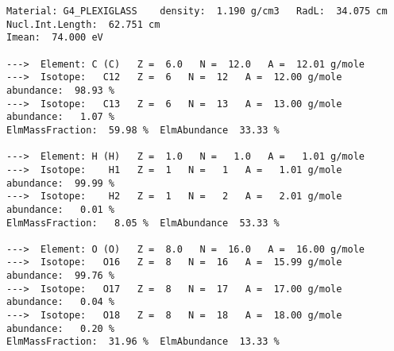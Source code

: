 {\begin{verbatim}
Material: G4_PLEXIGLASS    density:  1.190 g/cm3   RadL:  34.075 cm   Nucl.Int.Length:  62.751 cm 
Imean:  74.000 eV 

--->  Element: C (C)   Z =  6.0   N =  12.0   A =  12.01 g/mole
--->  Isotope:   C12   Z =  6   N =  12   A =  12.00 g/mole   abundance:  98.93 %
--->  Isotope:   C13   Z =  6   N =  13   A =  13.00 g/mole   abundance:   1.07 %
ElmMassFraction:  59.98 %  ElmAbundance  33.33 % 

--->  Element: H (H)   Z =  1.0   N =   1.0   A =   1.01 g/mole
--->  Isotope:    H1   Z =  1   N =   1   A =   1.01 g/mole   abundance:  99.99 %
--->  Isotope:    H2   Z =  1   N =   2   A =   2.01 g/mole   abundance:   0.01 %
ElmMassFraction:   8.05 %  ElmAbundance  53.33 % 

--->  Element: O (O)   Z =  8.0   N =  16.0   A =  16.00 g/mole
--->  Isotope:   O16   Z =  8   N =  16   A =  15.99 g/mole   abundance:  99.76 %
--->  Isotope:   O17   Z =  8   N =  17   A =  17.00 g/mole   abundance:   0.04 %
--->  Isotope:   O18   Z =  8   N =  18   A =  18.00 g/mole   abundance:   0.20 %
ElmMassFraction:  31.96 %  ElmAbundance  13.33 % 
\end{verbatim}
}